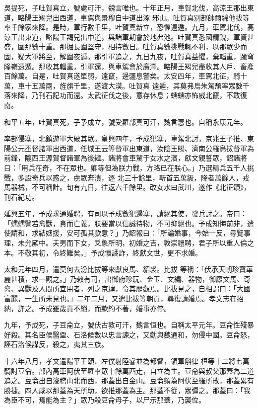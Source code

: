 \begin{pinyinscope}
 吳提死，子吐賀真立，號處可汗，魏言唯也。十年正月，車賀北伐，高涼王那出東道，略陽王羯兒出西道，車駕與景穆自中道出涿
 邪山。吐賀真別部帥爾綿他拔等率千餘家來降。是時，軍行數千里，吐賀真新立，恐懼遠遁。九月，車駕北伐，高涼王出東道，略陽王羯兒出中道，與諸軍期會於地弗池。吐賀真悉國精銳，軍資甚盛，圍那數十重。那掘長圍堅守，相持數日。吐賀真數挑戰輒不利，以那眾少而固，疑大軍將至，解圍夜遁。那引軍追之，九日九夜，吐賀真益懼，棄輜重，踰穹隆嶺遠遁。那收其輜重，引軍還，與車駕會於廣澤。略陽王羯兒盡收其人戶、畜產百餘萬。自是，吐賀真遂單弱，遠竄，邊疆息警矣。太安四年，車駕北征，騎十萬，車十五萬兩，旌旗千里，遂渡大漠。吐賀真
 遠遁，其莫弗烏朱駕頹率眾數千落來降，乃刊石記功而還。太武征伐之後，意存休息；蠕蠕亦怖威北竄，不敢復南。



 和平五年，吐賀真死，子予成立，號受羅部真可汗，魏言惠也。自稱永康元年。



 率部侵塞，北鎮遊軍大破其眾。皇興四年，予成犯塞，車駕北討，京兆王子推、東陽公元丕督諸軍出西道，任城王云等督軍出東道，汝陰王賜、濟南公羅烏拔督軍為前鋒，隴西王源賀督諸軍為後繼。諸將會車駕于女水之濱，獻文親誓眾，詔諸將曰：「用兵在奇，不在眾也。卿等但為朕力戰，方略已在朕心。」乃選精兵五千人挑戰，多設奇兵以惑之，虜眾奔潰，逐
 北三十餘里，斬首五萬級，降者萬餘人，戎馬器械，不可稱計。旬有九日，往返六千餘里。改女水曰武川，遂作《北征頌》，刊石紀功。



 延興五年，予成求通婚聘，有司以予成數犯邊塞，請絕其使，發兵討之。帝曰：「蠕蠕譬若禽獸，貪而亡義，朕要當以信誠待物，不可抑絕也。予成知悔前非，遣使請和，求結姻援，安可孤其款意？」乃詔報曰：「所論婚事，今始一反，尋覽事理，未允厥中。夫男而下女，爻象所明，初婚之吉，敦崇禮聘，君子所以重人倫之本。不敬其初，令終難矣。」予成懷譎詐，終獻文世，更不求婚。



 太和元年四月，遣莫何去汾比拔等來獻良馬、貂裘。比拔
 等稱：「伏承天朝珍寶華麗甚積，求一觀之。」乃敕有司，出御府珍玩、金玉、文繡、器物，御廄文馬、奇禽、異獸及人間所宜用者，列之京肆，令其歷觀焉。比拔見之，自相謂曰：「大國富麗，一生所未見也。」二年二月，又遣比拔等朝貢，尋復請婚焉。孝文志在招納，許之。予成雖歲貢不絕，而款約不著，婚事亦停。



 九年，予成死，子豆侖立，號伏古敦可汗，魏言恒也。自稱太平元年。豆侖性殘暴好殺。其名臣侯醫垔、石洛候數以忠言諫之，又勸與魏通和，勿侵中國。豆侖怒，誣石洛候謀反，殺之，夷其三族。



 十六年八月，孝文遣陽平王頤、左僕射陸睿並為都督，領軍斛律
 桓等十二將七萬騎討豆侖。部內高車阿伏至羅率眾十餘萬西走，自立為主。豆侖與叔父那蓋為二道追之。豆侖出自浚稽山北而西，那蓋出自金山。豆侖頻為阿伏至羅所敗，那蓋累有勝捷。四人咸以那蓋為天所助，欲推那蓋為主。那蓋不從，眾彊之。那蓋曰：「我為臣不可，焉能為主？」眾乃殺豆侖母子，以尸示那蓋，乃襲位。




\end{pinyinscope}
